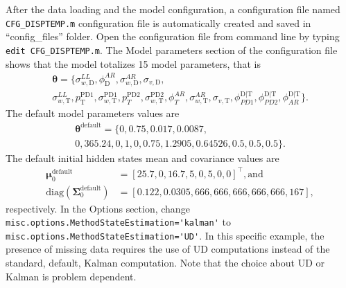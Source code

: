 After the data loading and the model configuration, a configuration file named \lstinline[basicstyle = \mlttfamily \small, backgroundcolor = \color{light-gray}]!CFG_DISPTEMP.m! configuration file is automatically created and saved in ``config\_files'' folder.
Open the configuration file from \MATLAB{} command line by typing  \colorbox{light-gray}{\lstinline[basicstyle = \mlttfamily \small, backgroundcolor = \color{light-gray}]!edit CFG_DISPTEMP.m!}.
The Model parameters section of the configuration file shows that the model totalizes 15 model parameters, that is 
\begin{gather*}
\bm\theta=\{\sigma_{w, \text{D}}^{LL},  \phi^{AR}_{\text{D}}, \sigma_{w,\text{D}}^{AR} ,\sigma_{v,\text{D}},  \\
 \sigma_{w, \text{T}}^{LL}, p^{\text{PD1}}_{\text{T}}, \sigma_{w,\text{T}}^{\text{PD1}} , p^{\text{PD2}}_{T}, \sigma_{w, \text{T}}^{\text{PD2}}, \phi^{AR}_{T}, \sigma_{w, \text{T}}^{AR}, \sigma_{v,\text{T}}, \phi^{\text{D}|\text{T}}_{PD1}, \phi^{\text{D}|\text{T}}_{PD2},  \phi^{\text{D}|\text{T}}_{AR}\}.
\end{gather*}
The default model parameters values are 
\begin{gather*}
\bm\theta^{\text{default}}=\{0, 0.75, 0.017, 0.0087, \\
0, 365.24, 0, 1, 0, 0.75, 1.2905, 0.64526, 0.5, 0.5, 0.5 \}.
\end{gather*}
The default initial hidden states mean  and covariance values are 
\begin{align*}
 \bm \mu^{\text{default}}_{0} & = [	25.7  ,	0  ,   	16.7  	, 5     ,	0   ,  	5   ,  	0    , 	0        ]^{\intercal}, \text{and} \\
 \text{diag}(\bm\Sigma^{\text{default}}_{0})  & = [	0.122, 	0.0305,	666,   	666,   	666,   	666,   	666 ,  	167     ],
\end{align*}
respectively.
In the Options section, change \lstinline[basicstyle = \mlttfamily \small, backgroundcolor = \color{light-gray}]!misc.options.MethodStateEstimation='kalman'! to \lstinline[basicstyle = \mlttfamily \small, backgroundcolor = \color{light-gray}]!misc.options.MethodStateEstimation='UD'!. 
In this specific example, the presence of missing data requires the use of UD computations instead of the standard, default, Kalman computation.
Note that the choice about UD or Kalman is problem dependent. 

